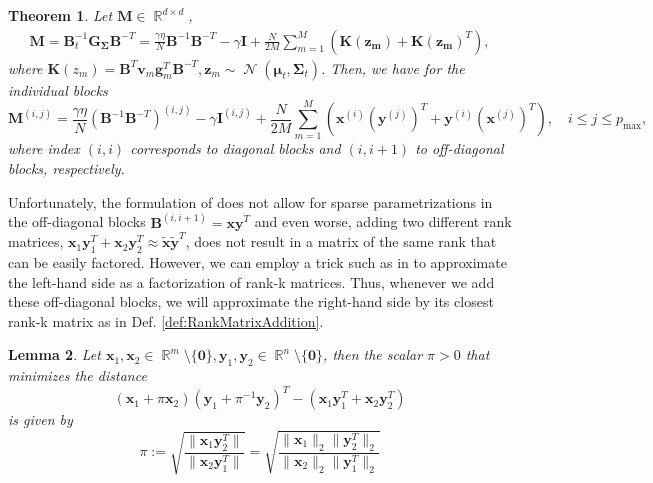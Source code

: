 \documentclass[a4paper, 11pt, oneside]{scrartcl}
\theoremstyle{break}
\newtheorem{lemma}{Lemma}[section]
\newtheorem{theorem}[lemma]{Theorem}
\DeclareMathOperator{\Normal}{\mathcal{N}}
\DeclareMathOperator{\Real}{\mathbb{R}}
\newcommand{\matr}[1]{\boldsymbol{#1}}
\numberwithin{equation}{section}
\begin{document}
				\begin{theorem}
					Let $\matr{M} \in \Real^{d \times d}$,
					\begin{align}
						\matr{M} = \matr{B}_t^{-1} \matr{G_{\Sigma}} \matr{B}^{-T} = \frac{\gamma \eta}{N} \matr{B}^{-1} \matr{B}^{-T} - \gamma \matr{I} + \frac{N}{2 M} \sum_{m=1}^M (\matr{K(z_m)} + \matr{K(z_m)}^T),
					\end{align}
					where $\matr{K}(z_m) = \matr{B}^T \matr{v}_m \matr{g}_m^T \matr{B}^{-T}, \matr{z}_m \sim \Normal(\matr{\mu}_t, \matr{\Sigma}_t)$.
					Then, we have for the individual blocks
					\begin{equation*}
						\matr{M}^{(i, j)} = \frac{\gamma \eta}{N} \left( \matr{B}^{-1} \matr{B}^{-T} \right)^{(i, j)} - \gamma \matr{I}^{(i, j)} + \frac{N}{2M} \sum_{m=1}^M \left( \matr{x}^{(i)} (\matr{y}^{(j)})^T + \matr{y}^{(i)} (\matr{x}^{(j)})^T \right), \quad i \le j \le p_\text{max},
					\end{equation*}
					where index $(i, i)$ corresponds to diagonal blocks and $(i, i+1)$ to off-diagonal blocks, respectively. 
				\end{theorem}

				Unfortunately, the formulation of \parencite{LNK+21} does not allow for sparse parametrizations in the off-diagonal blocks $\matr{B}^{(i, i+1)} = \matr{x} \matr{y}^T$ and even worse, adding two different rank matrices, $\matr{x}_1 \matr{y}_1^T + \matr{x}_2 \matr{y}_2^T \approx \matr{\tilde{x}} \matr{\tilde{y}}^T$, does not result in a matrix of the same rank that can be easily factored.
				However, we can employ a trick such as in \parencite{MG15} to approximate the left-hand side as a factorization of rank-k matrices. 
				Thus, whenever we add these off-diagonal blocks, we will approximate the right-hand side by its closest rank-k matrix as in Def. \ref{def:RankMatrixAddition}.

				\begin{lemma}
					\label{lemma:RankMatrixAddition}
					Let $\matr{x}_1, \matr{x}_2 \in \Real^{m} \setminus \{\matr{0}\}, \matr{y}_1, \matr{y}_2 \in \Real^{n} \setminus \{\matr{0}\}$, then the scalar $\pi > 0$ that minimizes the distance
					\begin{equation}
						(\matr{x}_1 + \pi \matr{x}_2) (\matr{y}_1 + \pi^{-1} \matr{y}_2)^T - (\matr{x}_1 \matr{y}_1^T + \matr{x}_2 \matr{y}_2^T)
					\end{equation}
					is given by
					\begin{equation}
						\pi := \sqrt{\frac{\|\matr{x}_1 \matr{y}_2^T\|}{\|\matr{x}_2 \matr{y}_1^T\|}} = \sqrt{\frac{\|\matr{x}_1 \|_2 \|\matr{y}_2^T\|_2}{\|\matr{x}_2\|_2 \|\matr{y}_1^T\|_2}}
						\label{eqn:piScalarDefinition}
					\end{equation}
				\end{lemma}
\end{document}
